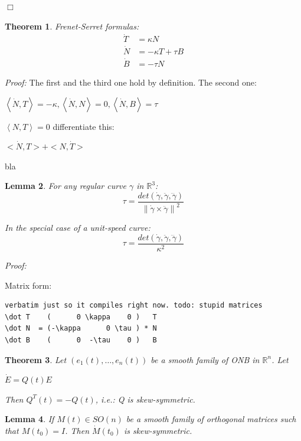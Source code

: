 \documentclass[a4paper,11pt,notitlepage,fullpage]{paper}
\newcommand{\y}{\gamma}
\newcommand{\dy}{\dot\gamma}
\newcommand{\ddy}{\ddot\gamma}
\theoremstyle{plain}
\newtheorem{thm}{Theorem}[section] %
\newtheorem{lem}[thm]{Lemma}
\theoremstyle{definition}
\begin{document}
\hfill $\Box$

\begin{thm}
Frenet-Serret formulas:
\begin{align*}
\dot T &= \kappa N \\
\dot N &= -\kappa T + \tau B \\
\dot B &= -\tau N
\end{align*}
\end{thm}

\emph{Proof:} The first and the third one hold by definition. The second one:

$\left\langle\dot N, T\right\rangle = -\kappa, \left\langle\dot N, N\right\rangle = 0, \left\langle\dot N, B\right\rangle = \tau$

$\left\langle N, T\right\rangle = 0$ differentiate this:

$<\Dot N, T> + <N, \dot T>$

bla


\begin{lem}
For any regular curve $\y$ in $\mathbb R^3$:
\begin{equation*}
\tau = \frac{det(\dy, \ddy, \dddot\gamma)}{\left\| \dy \times \ddy\right\|^2}
\end{equation*}

In the special case of a unit-speed curve:
\begin{equation*}
\tau = \frac{det(\dy, \ddy, \dddot\gamma)}{\kappa^2}
\end{equation*}

\end{lem}

\emph{Proof:}

Matrix form:

\begin{verbatim}
verbatim just so it compiles right now. todo: stupid matrices
\dot T    (      0 \kappa    0 )   T
\dot N  = (-\kappa      0 \tau ) * N
\dot B    (      0  -\tau    0 )   B
\end{verbatim}

\begin{thm}
Let $(e_1(t), \hdots, e_n(t))$ be a smooth family of ONB in $\mathbb R^n$. Let

$\dot E = Q(t) E$

Then $Q^T(t) = -Q(t)$, i.e.: Q is skew-symmetric.

\end{thm}

\begin{lem}
If $M(t) \in SO(n)$ be a smooth family of orthogonal matrices such that $M(t_0) = I$. Then $\dot M(t_0)$ is skew-symmetric.
\end{lem}
\end{document}
